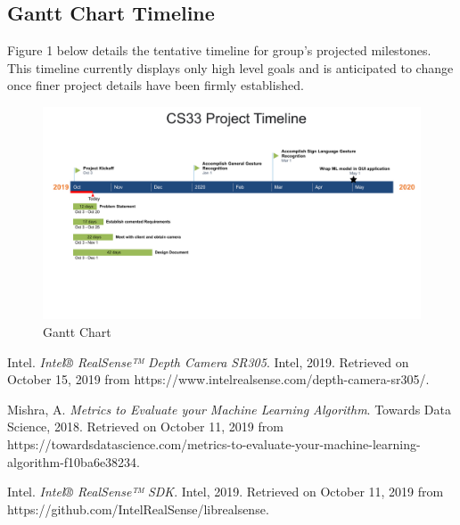 \documentclass[onecolumn, draftclsnofoot,10pt, compsoc]{IEEEtran}
\begin{document}
\subsection{Gantt Chart Timeline}
Figure 1 below details the tentative timeline for group's projected milestones. 
This timeline currently displays only high level goals and is anticipated to change once finer project details have been firmly established. 
\begin{figure}[htp]
    \centering
    \includegraphics[width=17cm]{SoftwareDevelopment.png}
    \caption{Gantt Chart}
    \label{fig:Gantt Chart}
\end{figure}
\newpage
\begin{thebibliography}{9}

Intel. 
\textit{Intel® RealSense™ Depth Camera SR305}. 
Intel, 2019. Retrieved on October 15, 2019 from https://www.intelrealsense.com/depth-camera-sr305/.

Mishra, A. 
\textit{Metrics to Evaluate your Machine Learning Algorithm}. 
Towards Data Science, 2018. Retrieved on October 11, 2019 from https://towardsdatascience.com/metrics-to-evaluate-your-machine-learning-algorithm-f10ba6e38234.


Intel. 
\textit{Intel® RealSense™ SDK}. 
Intel, 2019. Retrieved on October 11, 2019 from https://github.com/IntelRealSense/librealsense.


\end{thebibliography}
\end{document}
